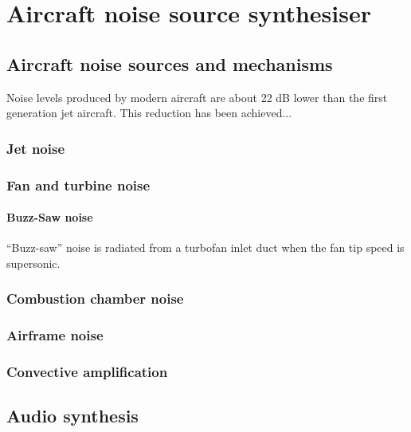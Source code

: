 \part{Aircraft noise source synthesiser}

\chapter{Aircraft noise sources and mechanisms}

Noise levels produced by modern aircraft are about 22 dB lower than the first generation jet aircraft. \cite{Zapoozhets2011}
This reduction has been achieved...

\section{Jet noise}

\section{Fan and turbine noise}


\subsection{Buzz-Saw noise}
“Buzz-saw” noise is radiated from a turbofan inlet duct when the fan tip speed 
is supersonic. \cite{McAlpine2007}


\section{Combustion chamber noise}

\section{Airframe noise}


\section{Convective 
amplification}\label{sec:source_synthesiser_convective_amplification}


\chapter{Audio synthesis}

